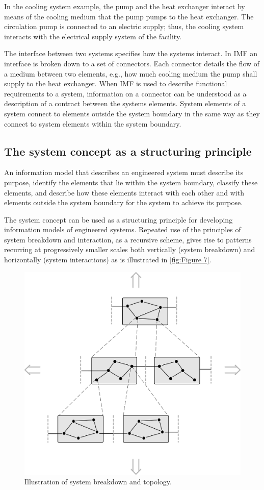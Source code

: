 \documentclass[../main.tex]{subfiles}
\begin{document}
In the cooling system example, the pump and the heat exchanger interact by means of the cooling medium that the pump
pumps to the heat exchanger. The circulation pump is connected to an electric supply; thus, the cooling system
interacts with the electrical supply system of the facility.
 
The interface between two systems specifies how the systems interact. 
In IMF an interface is broken down to a set of connectors. Each
connector details the flow of a medium between two elements, e.g., how much cooling medium the pump shall supply 
to the heat exchanger. When IMF is used to describe functional requirements to a system,  
information on a connector 
can be understood as a description of a contract between the systems elements. 
  System elements of a system connect to elements outside the system boundary in the same way as they connect to system elements within the system boundary.
  
\subsection{The system concept as a structuring principle}
\label{sec:The_system_concept_as_structuring_principle}
An information model that describes an engineered system must describe its purpose, identify the elements that lie within the system boundary, classify these elements, and describe how these elements interact with each other and with elements outside the system boundary for the system to achieve its purpose. 

The system concept can be used as a structuring principle 
for developing  information models of engineered systems. Repeated use of the principles of system breakdown and interaction, as a recursive scheme, gives rise to  patterns
recurring at progressively smaller scales both vertically (system breakdown) and horizontally (system interactions) as is illustrated in \autoref{fig:Figure 7}.

\begin{figure}[htb]
  \centering
  \includegraphics[width=.7\textwidth]{img/IMFmanual-img007.png}
  \caption{Illustration of system breakdown and topology.}
  \label{fig:Figure 7}
\end{figure}
\end{document}

